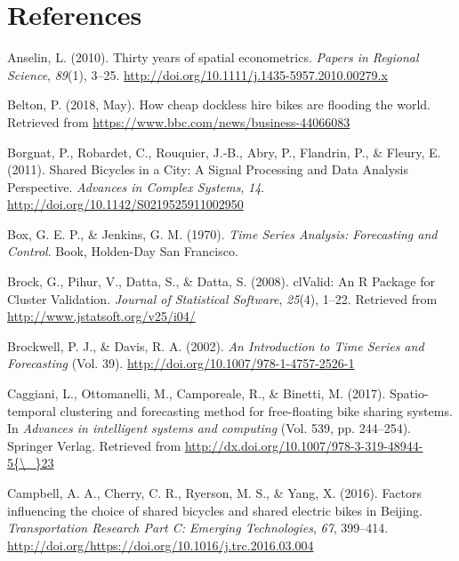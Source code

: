 \documentclass[12pt,oneside]{reedthesis}
\begin{document}
\backmatter

\chapter*{References}\label{references}


\noindent

\setlength{\parindent}{-0.20in} \setlength{\leftskip}{0.20in}
\setlength{\parskip}{8pt}

\hypertarget{refs}{}
\hypertarget{ref-anselin2010}{}
Anselin, L. (2010). Thirty years of spatial econometrics. \emph{Papers
in Regional Science}, \emph{89}(1), 3--25.
\url{http://doi.org/10.1111/j.1435-5957.2010.00279.x}

\hypertarget{ref-bbc}{}
Belton, P. (2018, May). How cheap dockless hire bikes are flooding the
world. Retrieved from \url{https://www.bbc.com/news/business-44066083}

\hypertarget{ref-borgnat2011}{}
Borgnat, P., Robardet, C., Rouquier, J.-B., Abry, P., Flandrin, P., \&
Fleury, E. (2011). Shared Bicycles in a City: A Signal Processing and
Data Analysis Perspective. \emph{Advances in Complex Systems},
\emph{14}. \url{http://doi.org/10.1142/S0219525911002950}

\hypertarget{ref-box1970}{}
Box, G. E. P., \& Jenkins, G. M. (1970). \emph{Time Series Analysis:
Forecasting and Control}. Book, Holden-Day San Francisco.

\hypertarget{ref-clValid}{}
Brock, G., Pihur, V., Datta, S., \& Datta, S. (2008). clValid: An R
Package for Cluster Validation. \emph{Journal of Statistical Software},
\emph{25}(4), 1--22. Retrieved from
\url{http://www.jstatsoft.org/v25/i04/}

\hypertarget{ref-brockwell2002}{}
Brockwell, P. J., \& Davis, R. A. (2002). \emph{An Introduction to Time
Series and Forecasting} (Vol. 39).
\url{http://doi.org/10.1007/978-1-4757-2526-1}

\hypertarget{ref-caggiani2017}{}
Caggiani, L., Ottomanelli, M., Camporeale, R., \& Binetti, M. (2017).
Spatio-temporal clustering and forecasting method for free-floating bike
sharing systems. In \emph{Advances in intelligent systems and computing}
(Vol. 539, pp. 244--254). Springer Verlag. Retrieved from
\href{http://dx.doi.org/10.1007/978-3-319-48944-5\%7B/_\%7D23}{http://dx.doi.org/10.1007/978-3-319-48944-5\{\textbackslash{}\_\}23}

\hypertarget{ref-campbell2016}{}
Campbell, A. A., Cherry, C. R., Ryerson, M. S., \& Yang, X. (2016).
Factors influencing the choice of shared bicycles and shared electric
bikes in Beijing. \emph{Transportation Research Part C: Emerging
Technologies}, \emph{67}, 399--414.
\url{http://doi.org/https://doi.org/10.1016/j.trc.2016.03.004}
\end{document}
